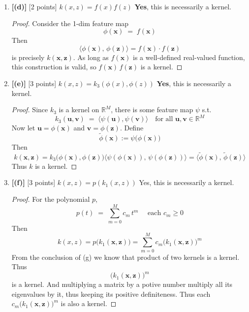 \documentclass[lang=cn,11pt]{elegantbook}
\begin{document}
\begin{enumerate}
\begin{proof}
If \(k_1\) is PSD, then for any finite set \(\{\mathbf{x}^{(1)}, \dots, \mathbf{x}^{(N)}\}\), the Gram matrix \(K_1\) of \(k_1\) is PSD, so all of its eigenvalues are \(\ge 0\).  Since \textbf{positive $a$}, then multiplying by \(-a\) simply multiplies all eigenvalues by \(-a\).  That makes the resulting matrix have nonpositive eigenvalues and thus not be PSD unless it is the all-zero matrix.  
\end{proof}
    \item \textbf{[(d)] }[2 points] $k(x, z) = f(x)f(z)$
\textbf{Yes}, this is necessarily a kernel.
\begin{proof}
Consider the 1-dim feature map
\[
  \phi(\mathbf{x}) \;=\; f(\mathbf{x})
\]
Then
\[
  \langle \phi(\mathbf{x}), \,\phi(\mathbf{z}) \rangle  = f(\mathbf{x}) \cdot f(\mathbf{z})
\]
is precisely \(k(\mathbf{x}, \mathbf{z})\).  As long as \(f(\mathbf{x})\) is a well-defined real-valued function, this construction is valid, so \(f(\mathbf{x})\,f(\mathbf{z})\) is a kernel.
\end{proof}
    \item \textbf{[(e)]} [3 points] $k(x, z) = k_3(\phi(x), \phi(z))$
\textbf{Yes}, this is necessarily a kernel.
\begin{proof}
  Since \(k_3\) is a kernel on \(\mathbb{R}^M\), there is some feature map \(\psi \) s.t.
\[
  k_3(\mathbf{u}, \mathbf{v}) \;=\; \langle \psi(\mathbf{u}), \psi(\mathbf{v}) \rangle
  \quad \text{for all } \mathbf{u},\mathbf{v} \in \mathbb{R}^M
\]
Now let \(\mathbf{u} = \phi(\mathbf{x})\) and \(\mathbf{v} = \phi(\mathbf{z})\).  Define  \[
  \tilde{\phi}(\mathbf{x}) :=  \psi\bigl(\phi(\mathbf{x})\bigr)
\]
Then
\[
  k(\mathbf{x}, \mathbf{z}) = k_3\bigl(\phi(\mathbf{x}), \phi(\mathbf{z})\bigr) \langle \psi(\phi(\mathbf{x})), \,\psi(\phi(\mathbf{z})) \rangle =  \langle \tilde{\phi}(\mathbf{x}), \,\tilde{\phi}(\mathbf{z}) \rangle
\]
Thus \(k\) is a kernel.  
\end{proof}
    \item \textbf{[(f)]} [3 points] $k(x, z) = p(k_1(x, z))$
Yes, this is necessarily a kernel.
\begin{proof}
For the polynomial $p$,
\[  p(t) \;=\; \sum_{m=0}^M c_m\,t^m 
  \quad \text{ each } c_m \ge 0
\]Then
\[
k(x, z)   = p\!\bigl(k_1(\mathbf{x}, \mathbf{z})\bigr)  = \sum_{m=0}^M c_m \bigl(k_1(\mathbf{x}, \mathbf{z})\bigr)^m
\]
From the conclusion of (g) we know that product of two kernels is a kernel. Thus \[\bigl(k_1(\mathbf{x}, \mathbf{z})\bigr)^m\] is a kernel. And multiplying a matrix by a potive number multiply all its eigenvalues by it, thus keeping its positive definiteness. Thus each $c_m \bigl(k_1(\mathbf{x}, \mathbf{z})\bigr)^m $ is also a kernel.


\end{proof}
\end{enumerate}
\end{document}
